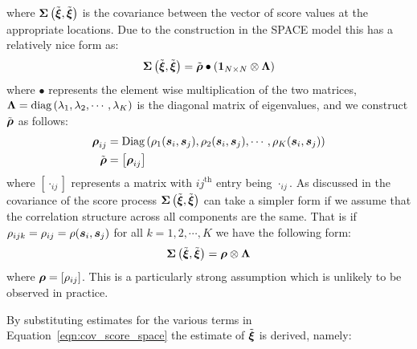 where $ \bm{{\Sigma}}\left(\tilde{\bm{{\xi}}}, \tilde{\bm{{\xi}}}\right)$ is the covariance between the vector of score values at the appropriate locations. Due to the construction in the SPACE model this has a relatively nice form as:
\begin{equation}
	 \bm{{\Sigma}}\left(\tilde{\bm{{\xi}}}, \tilde{\bm{{\xi}}}\right) = \tilde{\bm{{\rho}}} \bullet \left(\bm{{1}}_{N \times N} \otimes \bm{{\Lambda}} \right)
	 \label{eqn:cov_score_space}
\end{equation}
where $\bullet$ represents the element wise multiplication of the two matrices, $\bm{{\Lambda}} = \text{diag}\left(\lambda_1, \lambda_2, \cdots, \lambda_K\right)$ is the diagonal matrix of eigenvalues, and we construct $\tilde{\bm{{\rho}}}$ as follows: 
\begin{align}
	\bm{{\rho}}_{ij} &= \text{Diag} \left( \rho_1(\bm{{s}}_{i}, \bm{{s}}_{j}), \rho_2(\bm{{s}}_{i}, \bm{{s}}_{j}), \cdots, \rho_K(\bm{{s}}_{i}, \bm{{s}}_{j}) \right) \\
	\tilde{\bm{{\rho}}} &= \left[\bm{{\rho}}_{ij}\right]
\end{align}
where $\left[\cdot_{ij}\right]$ represents a matrix with ${ij}^\text{th}$ entry being $\cdot_{ij}$.
As discussed in \citep{liu_functional_2017} the covariance of the score process $\bm{{\Sigma}}\left(\tilde{\bm{{\xi}}}, \tilde{\bm{{\xi}}}\right)$ can take a simpler form if we assume that the correlation structure across all components are the same. 
That is if $\rho_{ijk} = \rho_{ij} = \rho(\bm{{s}}_{i}, \bm{{s}}_{j}) $ for all $k=1, 2, \cdots, K$ we have the following form:
\begin{equation}
	\bm{{\Sigma}}\left(\tilde{\bm{{\xi}}}, \tilde{\bm{{\xi}}}\right) = \bm{{\rho}} \otimes \bm{{\Lambda}}
	\label{eqn:cov_score_space_separable}
\end{equation}
where $\bm{{\rho}} = \left[\rho_{ij}\right]$.
This is a particularly strong assumption which is unlikely to be observed in practice.

By substituting estimates for the various terms in Equation~\eqref{eqn:cov_score_space} the estimate of $\tilde{\bm{{\xi}}}$ is derived, namely: 

